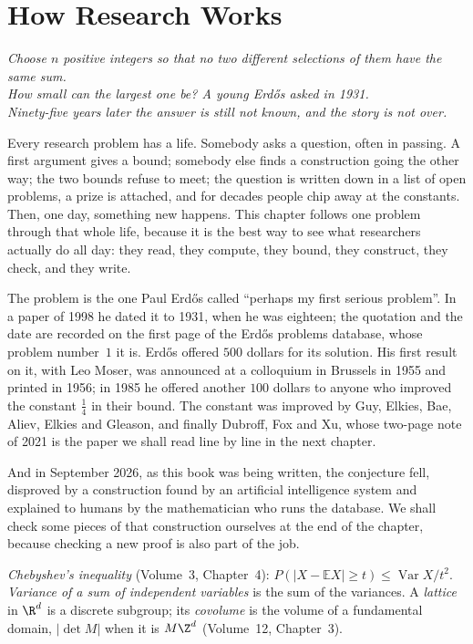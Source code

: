 \chapter{How Research Works}
\label{ch:research}

\begin{center}\itshape
Choose $n$ positive integers so that no two different selections of them have the same sum.\\
How small can the largest one be? A young Erd\H os asked in 1931.\\
Ninety-five years later the answer is still not known, and the story is not over.
\end{center}

Every research problem has a life. Somebody asks a question, often in passing. A first argument gives a bound; somebody else
finds a construction going the other way; the two bounds refuse to meet; the question is written down in a list of open
problems, a prize is attached, and for decades people chip away at the constants. Then, one day, something new happens. This
chapter follows one problem through that whole life, because it is the best way to see what researchers actually do all day:
they read, they compute, they bound, they construct, they check, and they write.

The problem is the one Paul Erd\H os called ``perhaps my first serious problem''. In a paper of 1998 he dated it to
1931, when he was eighteen; the quotation and the date are recorded on the first page of the Erd\H os problems database, whose
problem number~$1$ it is. Erd\H os offered $500$ dollars for its solution. His first result on it, with Leo Moser, was announced at
a colloquium in Brussels in 1955 and printed in 1956; in 1985 he offered another $100$ dollars to anyone who improved the constant
$\frac14$ in their bound. The constant was improved by Guy, Elkies, Bae, Aliev, Elkies and Gleason, and finally Dubroff, Fox and
Xu, whose two-page note of 2021 is the paper we shall read line by line in the next chapter.

And in September 2026, as this book was being written, the conjecture fell, disproved by a construction found by an
artificial intelligence system and explained to humans by the mathematician who runs the database. We shall check some pieces of
that construction ourselves at the end of the chapter, because checking a new proof is also part of the job.

\begin{reminder}
\emph{Chebyshev's inequality} (Volume~3, Chapter~4): $P(|X-\mathbb EX|\ge t)\le\operatorname{Var}X/t^2$. \emph{Variance of a sum of independent
variables} is the sum of the variances. A \emph{lattice} in $\R^d$ is a discrete subgroup; its \emph{covolume} is the volume of a fundamental domain,
$|\det M|$ when it is $M\Z^d$ (Volume~12, Chapter~3).
\end{reminder}

